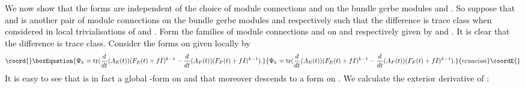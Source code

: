 \documentclass[a4paper,reqno]{amsart}
\DeclareMathOperator{\tr}{tr}
\theoremstyle{plain}
\theoremstyle{definition}
\theoremstyle{remark}
\numberwithin{equation}{section}
\numberwithin{figure}{section}
\providecommand{\<}{\langle}
\renewcommand{\>}{\rangle}
\begin{document}
We now show that the forms \coordHE{} are independent of 
the choice of module connections \coordHE{} 
and \coordHE{} on the \coordHE{} bundle gerbe modules \coordHE{} and \coordHE{}.   
So suppose that  
\coordHE{} and \coordHE{} is another pair of module 
connections on the \coordHE{} bundle gerbe modules \coordHE{} and 
\coordHE{} respectively such that the difference \coordHE{} is trace class when considered in local trivialisations 
of \coordHE{} and \coordHE{}.   
Form the families of module connections \coordHE{} and 
\coordHE{} on \coordHE{} and \coordHE{} respectively given 
by \coordHE{} 
and \coordHE{}.  It is 
clear that the difference \coordHE{} 
is trace class.   
Consider the \coordHE{} forms \coordHE{} on \coordHE{} given locally by 
\begin{equation}\coord{}\boxEquation{ 
\Psi_k = \tr (\frac{d}{dt}(A_E(t))(F_E(t) 
+fI)^{k-1} - \frac{d}{dt}(A_F(t))(F_F(t) 
+fI)^{k-1}). 
}{ 
\Psi_k = \tr (\frac{d}{dt}(A_E(t))(F_E(t) 
+fI)^{k-1} - \frac{d}{dt}(A_F(t))(F_F(t) 
+fI)^{k-1}). 
}{ecuacion}\coordE{}\end{equation} 
It is easy to see that \coordHE{} is in fact a global 
\coordHE{}-form on \coordHE{} and that moreover 
\coordHE{} descends to a form on \coordHE{}.  We 
calculate the exterior derivative of \coordHE{}: 
\end{document}
